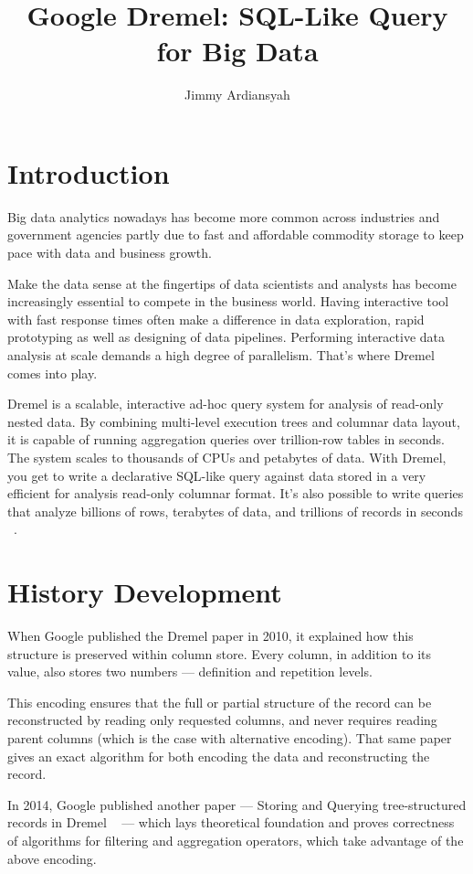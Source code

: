 \documentclass[9pt,twocolumn,twoside]{../../styles/osajnl}
\title{Google Dremel: SQL-Like Query for  Big Data}
\author[1,*]{Jimmy Ardiansyah}
\affil[1]{School of Informatics and Computing, Bloomington, IN 47408, U.S.A.}
\affil[*]{jardians@indiana.edu - S17-IR-2002}
\begin{document}
\maketitle



\section{Introduction}
Big data analytics nowadays has become more common across industries and government agencies partly due to fast and affordable commodity storage to keep pace with data and business growth.  

Make the data sense at the fingertips of data scientists and analysts has become increasingly essential to compete in the business world. Having interactive tool with fast response times often make a difference in data exploration, rapid prototyping as well as designing of data pipelines. Performing interactive data analysis at scale demands a high degree of parallelism. That's where Dremel comes into play.

Dremel is a scalable, interactive ad-hoc query system for analysis of read-only nested data. By combining multi-level execution trees and columnar data layout, it is capable of running aggregation queries over trillion-row tables in seconds.  The system scales to thousands of CPUs and petabytes of data.  With Dremel, you get to write a declarative SQL-like query against data stored in a very efficient for analysis read-only columnar format. It's also possible to write queries that analyze billions of rows, terabytes of data, and trillions of records in seconds ~\cite{paper-dremel}. 

\section{History Development}
When Google published the Dremel paper in 2010, it explained how this structure is preserved within column store. Every column, in addition to its value, also stores two numbers — definition and repetition levels.

This encoding ensures that the full or partial structure of the record can be reconstructed by reading only requested columns, and never requires reading parent columns (which is the case with alternative encoding). That same paper gives an exact algorithm for both encoding the data and reconstructing the record.

In 2014, Google published another paper — Storing and Querying tree-structured records in Dremel ~\cite{www-dremel}  — which lays theoretical foundation and proves correctness of algorithms for filtering and aggregation operators, which take advantage of the above encoding.
\end{document}
